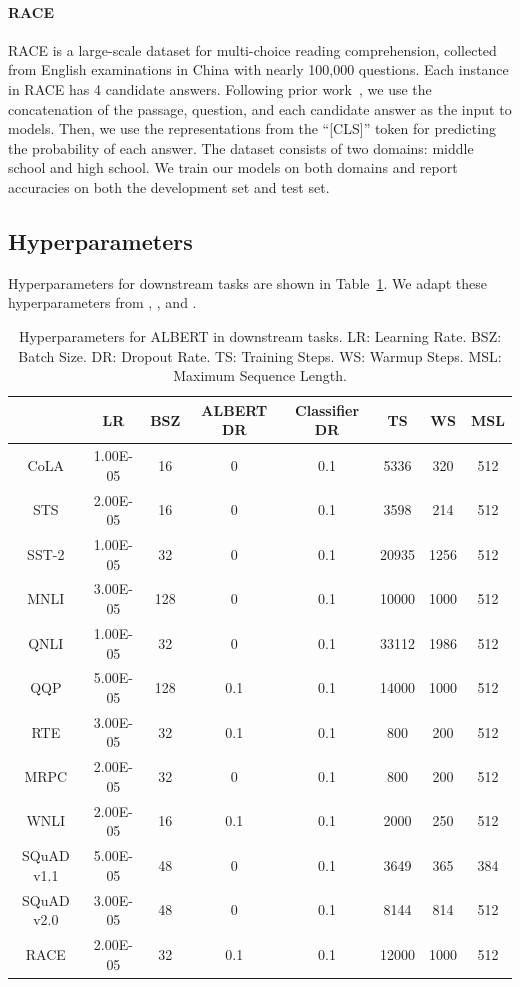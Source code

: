 \paragraph{RACE} RACE is a large-scale dataset for multi-choice reading comprehension, collected from English examinations in China with nearly 100,000 questions. Each instance in RACE has 4 candidate answers. Following prior work~\citep{yang2019xlnet,liu2019roberta}, we use the concatenation of the passage, question, and each candidate answer as the input to models. Then, we use the representations from the ``[CLS]'' token for predicting the probability of each answer. The dataset consists of two domains: middle school and high school. We train our models on both domains and report accuracies on both the development set and test set.


\subsection{Hyperparameters}

Hyperparameters for downstream tasks are shown in Table~\ref{tab:downstream-hyperparameter}.
We adapt these hyperparameters from \cite{liu2019roberta},  \cite{devlin2018bert}, and \cite{yang2019xlnet}.

\begin{table}[!htbp] 
    \small
    \centering

\begin{tabular}{c|ccccccc}
& LR & BSZ & ALBERT DR & Classifier DR & TS & WS & MSL \\\hline
CoLA & 1.00E-05 & 16 & 0 & 0.1 & 5336 & 320 & 512 \\
STS & 2.00E-05 & 16 & 0 & 0.1 & 3598 & 214 & 512 \\
SST-2 & 1.00E-05 & 32 & 0 & 0.1 & 20935 & 1256 & 512 \\
MNLI & 3.00E-05 & 128 & 0 & 0.1 & 10000 & 1000 & 512 \\
QNLI & 1.00E-05 & 32 & 0 & 0.1 & 33112 & 1986 & 512 \\
QQP & 5.00E-05 & 128 & 0.1 & 0.1 & 14000 & 1000 & 512 \\
RTE & 3.00E-05 & 32 & 0.1 & 0.1 & 800 & 200 & 512 \\
MRPC & 2.00E-05 & 32 & 0 & 0.1 & 800 & 200 & 512 \\
WNLI & 2.00E-05 & 16 & 0.1 & 0.1 & 2000 & 250 & 512 \\
SQuAD v1.1 & 5.00E-05 & 48 & 0 & 0.1 & 3649 & 365 & 384 \\
SQuAD v2.0 & 3.00E-05 & 48 & 0 & 0.1 & 8144 & 814 & 512 \\
RACE & 2.00E-05 & 32 & 0.1 & 0.1 & 12000 & 1000 & 512 \\
\end{tabular}
    \caption{Hyperparameters for ALBERT in downstream tasks. LR: Learning Rate. BSZ: Batch Size. DR: Dropout Rate. TS: Training Steps. WS: Warmup Steps. MSL: Maximum Sequence Length.}
    \label{tab:downstream-hyperparameter}
\end{table}




